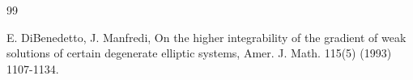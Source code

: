 \documentclass[10pt,a4paper]{article}
\theoremstyle{definition}
\numberwithin{equation}{section}
\begin{document}
\begin{thebibliography}{99}






 E. DiBenedetto, J. Manfredi, On the higher integrability of the gradient of weak solutions of certain degenerate elliptic systems, Amer. J. Math. 115(5) (1993) 1107-1134.








\end{thebibliography}
\end{document}

